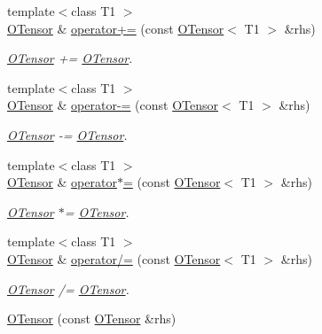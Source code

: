 \begin{DoxyCompactItemize}
{\footnotesize template$<$class T1 $>$ }\\\mbox{\hyperlink{classENSEM_1_1OTensor}{O\+Tensor}} \& \mbox{\hyperlink{classENSEM_1_1OTensor_a621ebf0d6d94eb56c1e3b31cb8c933b1}{operator+=}} (const \mbox{\hyperlink{classENSEM_1_1OTensor}{O\+Tensor}}$<$ T1 $>$ \&rhs)
\begin{DoxyCompactList}\small\item\em \mbox{\hyperlink{classENSEM_1_1OTensor}{O\+Tensor}} += \mbox{\hyperlink{classENSEM_1_1OTensor}{O\+Tensor}}. \end{DoxyCompactList}\item 
{\footnotesize template$<$class T1 $>$ }\\\mbox{\hyperlink{classENSEM_1_1OTensor}{O\+Tensor}} \& \mbox{\hyperlink{classENSEM_1_1OTensor_a8a087d8889bb41eafd237e270e4182fa}{operator-\/=}} (const \mbox{\hyperlink{classENSEM_1_1OTensor}{O\+Tensor}}$<$ T1 $>$ \&rhs)
\begin{DoxyCompactList}\small\item\em \mbox{\hyperlink{classENSEM_1_1OTensor}{O\+Tensor}} -\/= \mbox{\hyperlink{classENSEM_1_1OTensor}{O\+Tensor}}. \end{DoxyCompactList}\item 
{\footnotesize template$<$class T1 $>$ }\\\mbox{\hyperlink{classENSEM_1_1OTensor}{O\+Tensor}} \& \mbox{\hyperlink{classENSEM_1_1OTensor_a6edba72b265fa3629417ad85c9ae1477}{operator$\ast$=}} (const \mbox{\hyperlink{classENSEM_1_1OTensor}{O\+Tensor}}$<$ T1 $>$ \&rhs)
\begin{DoxyCompactList}\small\item\em \mbox{\hyperlink{classENSEM_1_1OTensor}{O\+Tensor}} $\ast$= \mbox{\hyperlink{classENSEM_1_1OTensor}{O\+Tensor}}. \end{DoxyCompactList}\item 
{\footnotesize template$<$class T1 $>$ }\\\mbox{\hyperlink{classENSEM_1_1OTensor}{O\+Tensor}} \& \mbox{\hyperlink{classENSEM_1_1OTensor_af8fb32358b6c05989221297a9b33096c}{operator/=}} (const \mbox{\hyperlink{classENSEM_1_1OTensor}{O\+Tensor}}$<$ T1 $>$ \&rhs)
\begin{DoxyCompactList}\small\item\em \mbox{\hyperlink{classENSEM_1_1OTensor}{O\+Tensor}} /= \mbox{\hyperlink{classENSEM_1_1OTensor}{O\+Tensor}}. \end{DoxyCompactList}\item 
\mbox{\hyperlink{classENSEM_1_1OTensor_aaf07253b5940da32a50af556d2f2afc6}{O\+Tensor}} (const \mbox{\hyperlink{classENSEM_1_1OTensor}{O\+Tensor}} \&rhs)

\end{DoxyCompactItemize}

